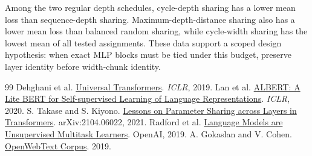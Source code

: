 \documentclass[11pt]{article}
\begin{document}
Among the two regular depth schedules, cycle-depth sharing has a lower mean loss than sequence-depth sharing. Maximum-depth-distance sharing also has a lower mean loss than balanced random sharing, while cycle-width sharing has the lowest mean of all tested assignments. These data support a scoped design hypothesis: when exact MLP blocks must be tied under this budget, preserve layer identity before width-chunk identity.

\begin{thebibliography}{99}
 Dehghani et al. \href{https://arxiv.org/abs/1807.03819}{Universal Transformers}. \textit{ICLR}, 2019.
 Lan et al. \href{https://arxiv.org/abs/1909.11942}{ALBERT: A Lite BERT for Self-supervised Learning of Language Representations}. \textit{ICLR}, 2020.
 S. Takase and S. Kiyono. \href{https://arxiv.org/abs/2104.06022}{Lessons on Parameter Sharing across Layers in Transformers}. arXiv:2104.06022, 2021.
 Radford et al. \href{https://cdn.openai.com/better-language-models/language_models_are_unsupervised_multitask_learners.pdf}{Language Models are Unsupervised Multitask Learners}. OpenAI, 2019.
 A. Gokaslan and V. Cohen. \href{https://skylion007.github.io/OpenWebTextCorpus/}{OpenWebText Corpus}. 2019.
\end{thebibliography}
\end{document}
